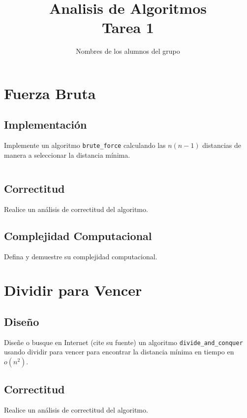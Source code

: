 \documentclass{article}
\begin{document}
\title{Analisis de Algoritmos \\ Tarea 1}
\author{Nombres de los alumnos del grupo}

\maketitle


\section{Fuerza Bruta}

\subsection{Implementación}
Implemente un algoritmo \texttt{brute\_force} calculando las $n(n-1)$ distancias de manera a seleccionar la distancia mínima.
\begin{lstlisting}
\end{lstlisting}

\subsection{Correctitud}
Realice un análisis de correctitud del algoritmo.

\subsection{Complejidad Computacional}
Defina y demuestre su complejidad computacional.

\section{Dividir para Vencer}

\subsection{Diseño}

Diseñe o busque en Internet (cite su fuente) un algoritmo \texttt{divide\_and\_conquer} usando dividir para vencer para encontrar la distancia mínima en tiempo en $o(n^2)$.

\subsection{Correctitud}
Realice un análisis de correctitud del algoritmo.
\end{document}
